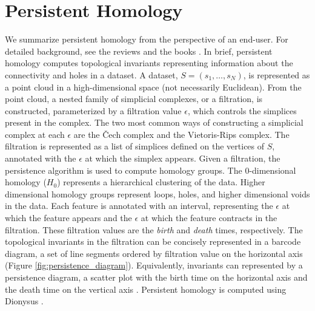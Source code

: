 
\section{Persistent Homology}

We summarize persistent homology from the perspective of an end-user.
For detailed background, see the reviews \cite{Carlsson:2009,Ghrist:2008} and the books \cite{Edelsbrunner:2010,Zomorodian:2005b}.
In brief, persistent homology computes topological invariants representing information about the connectivity and holes in a dataset.
A dataset, $S=(s_{1},\ldots,s_{N})$, is represented as a point cloud in a high-dimensional space (not necessarily Euclidean).
From the point cloud, a nested family of simplicial complexes, or a filtration, is constructed, parameterized by a filtration value $\epsilon$, which controls the simplices present in the complex.
The two most common ways of constructing a simplicial complex at each $\epsilon$ are the \v{C}ech complex and the Vietoris-Rips complex.
The filtration is represented as a list of simplices defined on the vertices of $S$, annotated with the $\epsilon$ at which the simplex appears.
Given a filtration, the persistence algorithm is used to compute homology groups.
The $0$-dimensional homology ($H_0$) represents a hierarchical clustering of the data.
Higher dimensional homology groups represent loops, holes, and higher dimensional voids in the data.
Each feature is annotated with an interval, representing the $\epsilon$ at which the feature appears and the $\epsilon$ at which the feature contracts in the filtration.
These filtration values are the \emph{birth} and \emph{death} times, respectively.
The topological invariants in the filtration can be concisely represented in a barcode diagram, a set of line segments ordered by filtration value on the horizontal axis (Figure \ref{fig:persistence_diagram}).
Equivalently, invariants can represented by a persistence diagram, a scatter plot with the birth time on the horizontal axis and the death time on the vertical axis .
Persistent homology is computed using Dionysus \cite{Morozov:2012}.

